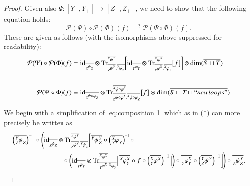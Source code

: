 \documentclass{amsart}
\def\tn{\textnormal}
\def\mc{\mathcal}
\def\dim{\tn{dim}}
\def\Trace{\tn{Tr}}
\def\taking{\colon}
\def\too{\longrightarrow}
\def\ol{\overline}
\def\id{\tn{id}}
\def\mcP{\mc{P}}
\newcommand{\inp}[1]{{#1_-}}
\newcommand{\outp}[1]{{#1_+}}
\newcommand{\feeddd}[3]{{\tensor*[^{#2}_{\color{white}{!}}]{{#1}}{^{#3}}}}%
\newcommand{\feeddc}[3]{{\tensor*[^{#2}]{{#1}}{_{#3}}}}
\newcommand{\feedcd}[3]{{\tensor*[_{#2}]{{#1}}{^{#3}}}}
\newcommand{\feedcc}[3]{{\tensor*[^{\color{white}{!}}_{#2}]{{#1}}{_{#3}}}}
\newcommand{\feedda}[3]{{\tensor*[^{#2}_{\color{white}{!}}]{{#1}}{^{#2}_{#3}}}}
\newcommand{\feedca}[3]{{\tensor*[_{#2}]{{#1}}{_{#2}^{#3}}}}
\newcommand{\feedad}[3]{{\tensor*[^{#2}_{#3}]{{#1}}{^{#2}}}}
\newcommand{\feedac}[3]{{\tensor*[_{#2}^{#3}]{{#1}}{_{#2}}}}
\theoremstyle{remark}
\theoremstyle{definition}
\begin{document}
\begin{proof}
Given also $\Psi\taking[\inp{Y},\outp{Y}]\too[\inp{Z},\outp{Z}]$, we need to show that the following equation holds: 
$$\mcP(\Psi)\circ\mcP(\Phi)(f)=^?\mcP(\Psi\circ\Phi)(f).$$
These are given as follows (with the isomorphisms above suppressed for readability):
\begin{align}
\label{eq:composition 1}
\mcP(\Psi)\circ\mcP(\Phi)(f)&=
\id_{\ol{\feedcc{\psi}{Z}{Z}}}\otimes\Trace^{\ol{\feeddd{\psi}{Y}{Y}}}_{\ol{\feedcd{\psi}{Z}{Y}},\ol{\feeddc{\psi}{Y}{Z}}}
\bigg[
\id_{\ol{\feedcc{\varphi}{Y}{Y}}}\otimes\Trace^{\ol{\feeddd{\varphi}{X}{X}}}_{\ol{\feedcd{\varphi}{Y}{X}},\ol{\feeddc{\varphi}{X}{Y}}}\big[f\big]
\bigg]
\otimes\dim(\ol{S\sqcup T})
\\\nonumber\\
\label{eq:composition 2}
\mcP(\Psi\circ\Phi)(f)&=
\id_{\ol{\feedcc{\psi\circ\varphi}{Z}{Z}}}\otimes \Trace^{\ol{\feeddd{\psi\circ\varphi}{X}{X}}}_{\ol{\feedcd{\psi\circ\varphi}{Z}{X}},\ol{\feeddc{\psi\circ\varphi}{X}{Z}}}\big[f\big]\otimes\dim(\ol{S\sqcup T\sqcup ``newloops"})
\end{align}

We begin with a simplification of \eqref{eq:composition 1} which as in ($*$) can more precisely be written as
\begin{align*}
&\Big(\ol{\feedac{\psi}{Z}{Y}}\Big)^{-1}\circ\Bigg(\id_{\ol{\feedcc{\psi}{Z}{Z}}}\otimes\Trace^{\ol{\feeddd{\psi}{Y}{Y}}}_{\ol{\feedcd{\psi}{Z}{Y}},\ol{\feeddc{\psi}{Y}{Z}}}
\bigg[\ol{\feedda{\psi}{Y}{Z}}\circ\Big(\ol{\feedac{\varphi}{Y}{X}}\Big)^{-1}\circ\\
&\hspace{1in}\circ\bigg(\id_{\ol{\feedcc{\varphi}{Y}{Y}}}\otimes \Trace^{\ol{\feeddd{\varphi}{X}{X}}}_{\ol{\feedcd{\varphi}{Y}{X}},\ol{\feeddc{\varphi}{X}{Y}}}\Big[\ol{\feedda{\varphi}{X}{Y}}\circ f\circ\Big(\ol{\feedad{\varphi}{X}{Y}}\Big)^{-1}\Big]\bigg)\circ\ol{\feedca{\varphi}{Y}{X}}\circ\Big(\ol{\feedad{\psi}{Y}{Z}}\Big)^{-1}\bigg]\Bigg)\circ\ol{\feedca{\psi}{Z}{Y}}.
\end{align*}


\end{proof}
\end{document}
